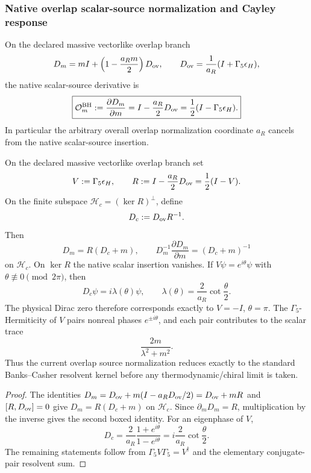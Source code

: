 \documentclass[12pt,a4paper]{article}
\begin{document}

\subsubsection{Native overlap scalar-source normalization and Cayley response}
\label{p10:sec:v165-overlap-scalar-source-normalization}

\begin{corollary}
\label{p10:cor:v165-overlap-scalar-source-derivative}
On the declared massive vectorlike overlap branch
\[
 D_m=mI+\left(1-\frac{a_Rm}{2}\right)D_{\rm ov},
 \qquad
 D_{\rm ov}=\frac1{a_R}(I+\Gamma_5\epsilon_H),
\]
the native scalar-source derivative is
\[
 \boxed{
 \mathcal O_m^{\rm BH}:=\frac{\partial D_m}{\partial m}
 =I-\frac{a_R}{2}D_{\rm ov}
 =\frac12(I-\Gamma_5\epsilon_H).}
\]
In particular the arbitrary overall overlap normalization coordinate $a_R$
cancels from the native scalar-source insertion.
\end{corollary}

\begin{theorem}
\label{p10:thm:v2158-overlap-cayley-scalar-response}
On the declared massive vectorlike overlap branch set
\[
 V:=\Gamma_5\epsilon_H,\qquad
 R:=I-\frac{a_R}{2}D_{\rm ov}=\frac12(I-V).
\]
On the finite subspace $\mathcal H_c=(\ker R)^\perp$, define
\[
 D_c:=D_{\rm ov}R^{-1}.
\]
Then
\[
 \boxed{D_m=R(D_c+m)},
 \qquad
 \boxed{D_m^{-1}\frac{\partial D_m}{\partial m}=(D_c+m)^{-1}}
\]
on $\mathcal H_c$.  On $\ker R$ the native scalar insertion vanishes.  If
$V\psi=e^{i\theta}\psi$ with $\theta\not\equiv0\pmod{2\pi}$, then
\[
 \boxed{D_c\psi=i\lambda(\theta)\psi,\qquad
 \lambda(\theta)=\frac{2}{a_R}\cot\frac\theta2.}
\]
The physical Dirac zero therefore corresponds exactly to $V=-I$,
$\theta=\pi$.  The $\Gamma_5$-Hermiticity of $V$ pairs nonreal phases
$e^{\pm i\theta}$, and each pair contributes to the scalar trace
\[
 \boxed{\frac{2m}{\lambda^2+m^2}.}
\]
Thus the current overlap source normalization reduces exactly to the standard
Banks--Casher resolvent kernel before any thermodynamic/chiral limit is taken.
\end{theorem}
\begin{proof}
The identities
$D_m=D_{\rm ov}+m(I-a_RD_{\rm ov}/2)=D_{\rm ov}+mR$ and
$[R,D_{\rm ov}]=0$ give $D_m=R(D_c+m)$ on $\mathcal H_c$.  Since
$\partial_mD_m=R$, multiplication by the inverse gives the second boxed
identity.  For an eigenphase of $V$,
\[
 D_c=\frac{2}{a_R}\frac{1+e^{i\theta}}{1-e^{i\theta}}
 =i\frac{2}{a_R}\cot\frac\theta2.
\]
The remaining statements follow from
$\Gamma_5V\Gamma_5=V^\dagger$ and the elementary conjugate-pair resolvent
sum.
\end{proof}
\end{document}
